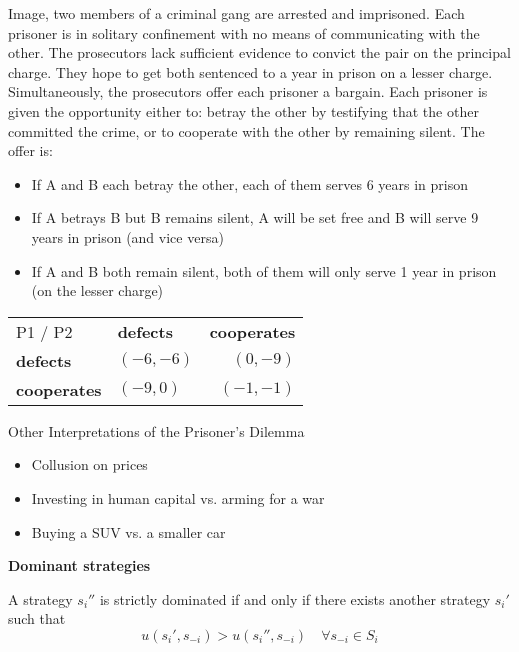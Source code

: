 \begin{example} \label{prisonersdilemma} 
	 Image, two members of a criminal gang are arrested and imprisoned. Each prisoner is in solitary confinement with no means of communicating with the other. The prosecutors lack sufficient evidence to convict the pair on the principal charge. They hope to get both sentenced to a year in prison on a lesser charge. Simultaneously, the prosecutors offer each prisoner a bargain. Each prisoner is given the opportunity either to: betray the other by testifying that the other committed the crime, or to cooperate with the other by remaining silent. The offer is:
	\begin{itemize}
		\item If A and B each betray the other, each of them serves 6 years in prison
		\item If A betrays B but B remains silent, A will be set free and B will serve 9 years in prison (and vice versa)
		\item If A and B both remain silent, both of them will only serve 1 year in prison (on the lesser charge)
	\end{itemize}
	
\begin{center}
	\begin{tabular}{|l|l|r|}
		\hline\hline
  			P1 / P2 & \textbf{defects} & \textbf{cooperates} \\
         		\cline{1-3}
   			\textbf{defects} & $(-6, -6)$ & $(0, -9)$ 	\arrayrulewidth2pt \\
            	\cline{1-3}
   			\textbf{cooperates} & $(-9, 0)$ & $(-1, -1)$ \\ \hline\hline
	\end{tabular}	
\end{center}


	Other Interpretations of the Prisoner's Dilemma
	\begin{itemize}
		\item Collusion on prices
		\item Investing in human capital vs. arming for a war
		\item Buying a SUV vs. a smaller car
	\end{itemize}
\end{example}


\textbf{Dominant strategies}

\begin{definition} 
	A strategy $s_{i}''$ is strictly dominated if and only if there exists another strategy $s_{i}'$ such that
	\[ u(s_{i}', s_{-i}) > u(s_{i}'', s_{-i}) \quad \forall s_{-i} \in S_{i} \]	
\end{definition}

